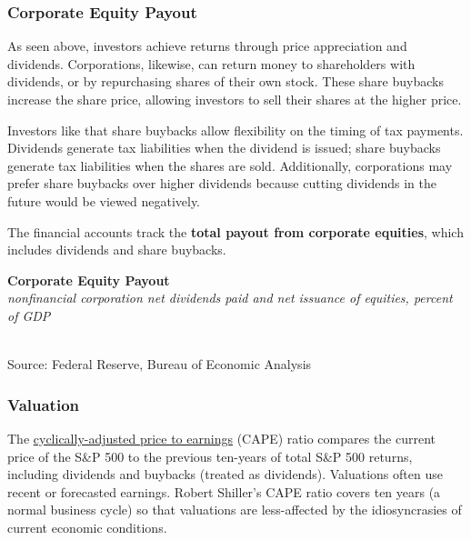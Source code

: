 \documentclass{report}
\makeatletter
\newcommand{\tbllink}[1]{\href{https://raw.githubusercontent.com/bdecon/US-chartbook/master/chartbook/data/#1}{\faTable}}
\newcommand*\short[1]{\expandafter\@gobbletwo\number\numexpr#1\relax}
\newcommand{\sbar}[4]{
		\addplot[ybar stacked, bar width=2.3pt, draw opacity=0, fill=#1] 
			table [x=#2, y=#3, col sep=comma]{#4};}
\newcommand{\dateaxisticks}{
		date coordinates in=x, axis line style={draw=none},
		xmax={2023-11-01},
		max space between ticks=40,	    
		xtick={{1990-01-01}, {1992-01-01}, {1994-01-01}, 
			{1996-01-01}, {1998-01-01}, {2000-01-01}, 
			{2002-01-01}, {2004-01-01}, {2006-01-01},
			{2008-01-01}, {2010-01-01}, {2012-01-01}, {2014-01-01},
		    {2016-01-01}, {2018-01-01}, {2020-01-01}, {2022-01-01}, 
		    {2024-01-01}, {2026-01-01}},
		minor xtick={{1989-01-01}, {1991-01-01}, {1993-01-01},
			{1995-01-01}, {1997-01-01}, {1999-01-01}, 
			{2001-01-01}, {2003-01-01}, {2005-01-01}, {2007-01-01},
		    {2009-01-01}, {2011-01-01}, {2013-01-01}, {2015-01-01},
		    {2017-01-01}, {2019-01-01}, {2021-01-01}, {2023-01-01}, 
		    {2025-01-01}, {2027-01-01}},
		enlarge y limits={0.06}, enlarge x limits={0.01},
		}
\newcommand{\bbar}[2]{extra #1 ticks = {{#2}}, extra #1 tick labels = ,
		extra #1 tick style = {grid=major, grid style={thick, black!25}},}
\newcommand{\rbars}{
		\fill[color=black!10] (axis cs:{1990-07-01},\pgfkeysvalueof{/pgfplots/ymin}) rectangle 
			(axis cs:{1991-03-01}, \pgfkeysvalueof{/pgfplots/ymax});
		\fill[color=black!10] (axis cs:{2007-12-01},\pgfkeysvalueof{/pgfplots/ymin}) rectangle 
			(axis cs:{2009-07-01}, \pgfkeysvalueof{/pgfplots/ymax});
		\fill[color=black!10] (axis cs:{2001-03-01},\pgfkeysvalueof{/pgfplots/ymin}) rectangle 
			(axis cs:{2001-11-01}, \pgfkeysvalueof{/pgfplots/ymax});
		\fill[color=black!10] (axis cs:{2020-02-01},\pgfkeysvalueof{/pgfplots/ymin}) rectangle 
			(axis cs:{2020-05-01}, \pgfkeysvalueof{/pgfplots/ymax});}
\makeatother
\begin{document}
{\begin{minipage}{0.76\textwidth}
\subsubsection*{Corporate Equity Payout}
\small As seen above, investors achieve returns through price appreciation and dividends. Corporations, likewise, can return money to shareholders with dividends, or by repurchasing shares of their own stock. These share buybacks increase the share price, allowing investors to sell their shares at the higher price. 

Investors like that share buybacks allow flexibility on the timing of tax payments. Dividends generate tax liabilities when the dividend is issued; share buybacks generate tax liabilities when the shares are sold. Additionally, corporations may prefer share buybacks over higher dividends because cutting dividends in the future would be viewed negatively. 

The financial accounts track the \textbf{total payout from corporate equities}, which includes dividends and share buybacks. 
\vspace{1mm}

\normalsize \textbf{Corporate Equity Payout}\\
\footnotesize{\textit{nonfinancial corporation net dividends paid and net issuance of equities, percent of GDP}}\\
\hspace*{-1mm} \\
\footnotesize{Source: Federal Reserve, Bureau of Economic Analysis} \hfill \tbllink{eq_payout.csv}
\end{minipage}
\newpage
\begin{minipage}{0.76\textwidth}
 
\subsubsection*{Valuation}
\small The \href{http://www.econ.yale.edu/~shiller/data.htm}{cyclically-adjusted price to earnings} (CAPE) ratio compares the current price of the S\&P 500 to the previous ten-years of total S\&P 500 returns, including dividends and buybacks (treated as dividends). Valuations often use recent or forecasted earnings. Robert Shiller's CAPE ratio covers ten years (a normal business cycle) so that valuations are less-affected by the idiosyncrasies of current economic conditions. 


\end{minipage}}
\end{document}
